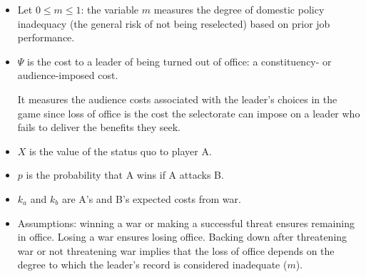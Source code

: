 \begin{itemize}
    \item Let $0 \leq m \leq 1$: the variable $m$ measures the degree of domestic policy inadequacy (the general risk of not being reselected) based on prior job performance.

    \item $\Psi$ is the cost to a leader of being turned out of office: a constituency- or audience-imposed cost.

    It measures the audience costs associated with the leader’s choices in the game since loss of office is the cost the selectorate can impose on a leader who fails to deliver the benefits they seek.

    \item $X$ is the value of the status quo to player A.

    \item $p$ is the probability that A wins if A attacks B.

    \item $k_a$ and $k_b$ are A's and B's expected costs from war.

    \item Assumptions: winning a war or making a successful threat ensures remaining in office. Losing a war ensures losing office. Backing down after threatening war or not threatening war implies that the loss of office depends on the degree to which the leader's record is considered inadequate ($m$).
\end{itemize}



